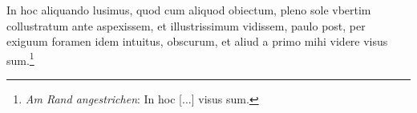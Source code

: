 \pend \pstart [p.~23] In hoc aliquando lusimus, quod  cum aliquod obiectum, pleno sole vbertim collustratum  ante aspexissem, et illustrissimum vidissem, paulo post,  per exiguum foramen idem intuitus, obscurum, et aliud  a primo mihi videre visus sum.\footnote{\textit{Am Rand angestrichen}: In hoc [...] visus sum.}